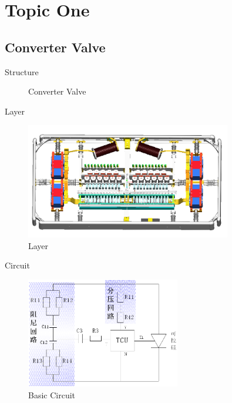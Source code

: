 \section{Topic One}
\subsection{Converter Valve}
\begin{frame}{Structure}
  \begin{figure}
    \qquad
    \caption{Converter Valve}
  \end{figure}
\end{frame}

\begin{frame}{Layer}
  \begin{figure}
    \centering
    \includegraphics[width=0.8\textwidth]{figures/layer}
    \caption{Layer}
  \end{figure}
\end{frame}

\begin{frame}{Circuit}
  \begin{figure}
    \centering
    \includegraphics[width=0.6\textwidth]{figures/circuit}
    \caption{Basic Circuit}
  \end{figure}
\end{frame}